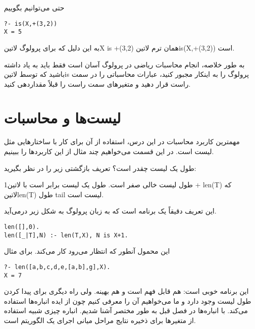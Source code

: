 حتی می‌توانیم بگوییم

\begin{latin}
\begin{lstlisting}
?- is(X,+(3,2))
X = 5
\end{lstlisting}
\end{latin}

به این دلیل که برای پرولوگ ‌لاتین{X is +(3,2)} همان ترم ‌لاتین{is(X,+(3,2))} است.

به طور خلاصه، انجام محاسبات ریاضی در پرولوگ آسان است فقط باید به یاد داشته باشید که توسط ‌لاتین{is} پرولوگ را به اینکار مجبور کنید، عبارات محاسباتی را در سمت راست قرار دهید و متغیرهای سمت راست را قبلاً مقداردهی کنید.

\section{لیست‌ها و محاسبات}
مهمترین کاربرد محاسبات در این درس، استفاده از آن برای کار با ساختارهایی مثل لیست است. در این قسمت می‌خواهیم چند مثال از این کاربردها را ببینیم.

طول یک لیست چقدر است؟ تعریف بازگشتی زیر را در نظر بگیرید:

\begin{enumerate}
 طول لیست خالی صفر است.
 طول یک لیست برابر است با ‌لاتین{1 + len(T)} که ‌لاتین{len(T)} طول tail لیست است.
\end{enumerate}

این تعریف دقیقاً یک برنامه است که به زبان پرولوگ به شکل زیر درمی‌آید.

\begin{latin}
\begin{lstlisting}
len([],0).
len([_|T],N) :- len(T,X), N is X+1.
\end{lstlisting}
\end{latin}

این محمول آنطور که انتظار می‌رود کار می‌کند. برای مثال

\begin{latin}
\begin{lstlisting}
?- len([a,b,c,d,e,[a,b],g],X).
X = 7
\end{lstlisting}
\end{latin}

این برنامه خوبی است: هم قابل فهم است و هم بهینه. ولی راه دیگری برای پیدا کردن طول لیست وجود دارد و ما می‌خواهیم آن را معرفی کنیم چون از ایده انباره‌ها استفاده می‌کند. با انباره‌ها در فصل قبل به طور مختصر آشنا شدیم. انباره چیزی شبیه استفاده از متغیرها برای ذخیره نتایج مراحل میانی اجرای یک الگوریتم است.

